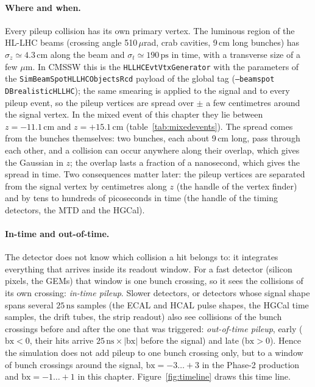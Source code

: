 \documentclass[11pt,a4paper]{article}
\newcommand{\code}[1]{\texttt{#1}}
\newcommand{\bx}{\ensuremath{\mathrm{bx}}}
\newcommand{\ns}{\,\mathrm{ns}}
\newcommand{\cm}{\,\mathrm{cm}}
\begin{document}
\paragraph{Where and when.} Every pileup collision has its own primary vertex. The luminous region of the
HL-LHC beams (crossing angle 510\,$\mu$rad, crab cavities, 9\,cm long bunches) has
$\sigma_z \simeq 4.3\cm$ along the beam and $\sigma_t \simeq 190\,\mathrm{ps}$ in time, with a transverse
size of a few $\mu$m. In CMSSW this is the \code{HLLHCEvtVtxGenerator} with the parameters of the
\code{SimBeamSpotHLLHCObjectsRcd} payload of the global tag (\code{--beamspot DBrealisticHLLHC}); the same
smearing is applied to the signal and to every pileup event, so the pileup vertices are spread over $\pm$
a few centimetres around the signal vertex. In the mixed event of this chapter they lie between
$z=-11.1\cm$ and $z=+15.1\cm$ (table~\ref{tab:mixedevents}).
The spread comes from the bunches themselves: two bunches, each about 9\,cm long, pass through each other,
and a collision can occur anywhere along their overlap, which gives the Gaussian in $z$; the overlap lasts a
fraction of a nanosecond, which gives the spread in time. Two consequences matter later: the pileup vertices
are separated from the signal vertex by centimetres along $z$ (the handle of the vertex finder) and by tens
to hundreds of picoseconds in time (the handle of the timing detectors, the MTD and the HGCal).

\paragraph{In-time and out-of-time.} The detector does not know which collision a hit belongs to: it
integrates everything that arrives inside its readout window. For a fast detector (silicon pixels, the GEMs)
that window is one bunch crossing, so it sees the collisions of its own crossing: \emph{in-time pileup}.
Slower detectors, or detectors whose signal shape spans several $25\ns$ samples (the ECAL and HCAL pulse
shapes, the HGCal time samples, the drift tubes, the strip readout) also see collisions of the bunch crossings
before and after the one that was triggered: \emph{out-of-time pileup}, early ($\bx<0$, their hits arrive
$25\ns\times|\bx|$ before the signal) and late ($\bx>0$). Hence the simulation does not add pileup to one
bunch crossing only, but to a window of bunch crossings around the signal, $\bx = -3\ldots+3$ in the Phase-2
production and $\bx=-1\ldots+1$ in this chapter.
Figure~\ref{fig:timeline} draws this time line.
\end{document}

